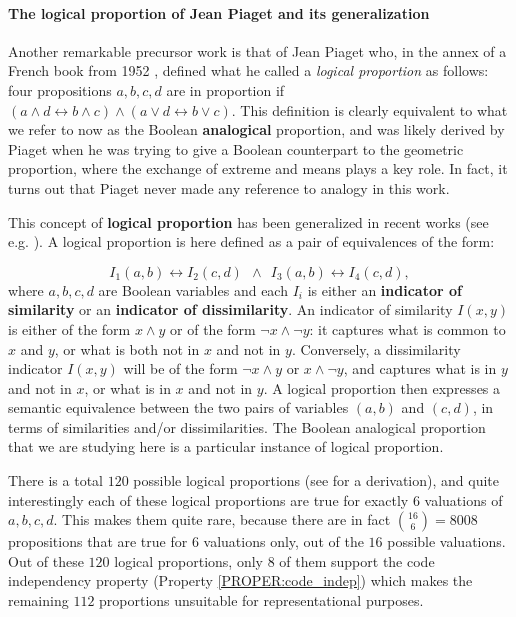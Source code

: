 \paragraph{The logical proportion of Jean Piaget and its generalization\\}
Another remarkable precursor work is that of Jean Piaget who, in the annex of a
French book from 1952 \cite{Pia52}, defined what he called a \textit{logical
proportion} as follows: four propositions $a, b, c,d$ are in proportion if $(a
\wedge d \leftrightarrow b \wedge c) \wedge (a \vee  d \leftrightarrow b \vee
c)$. This definition is clearly equivalent to what we refer to now as the
Boolean \textbf{analogical} proportion, and was likely derived by Piaget when
he was trying to give a Boolean counterpart to the geometric proportion, where
the exchange of extreme and means plays a key role. In fact, it turns out that
Piaget never made any reference to analogy in this work.

This concept of \textbf{logical proportion} has been generalized in recent
works (see e.g. \cite{PraRic13LU}). A logical proportion is here defined as a
pair of equivalences of the form:

$$I_1(a, b) \leftrightarrow I_2(c, d) ~~ \wedge ~~ I_3(a, b) \leftrightarrow I_4(c,
d),$$
where $a, b, c, d$ are Boolean variables and each $I_i$ is either an
\textbf{indicator of similarity} or an \textbf{indicator of dissimilarity}. An
indicator of similarity $I(x, y)$ is either of the form $x \wedge y$  or
of the form $\neg x \wedge \neg y$: it captures what is common to $x$ and $y$,
or what is both not in $x$ and not in $y$. Conversely, a dissimilarity indicator $I(x,
y)$ will be of the form $\neg x \wedge y$ or $x \wedge \neg y$,  and captures
what is in $y$ and not in $x$, or what is in $x$ and not in $y$.  A logical
proportion then expresses a semantic equivalence between the two pairs of
variables $(a, b)$ and $(c, d)$, in terms of similarities and/or
dissimilarities. The Boolean analogical proportion that we are studying here is
a particular instance of logical proportion.

There is a total $120$ possible logical proportions (see \cite{PraRic12} for a
derivation), and quite interestingly each of these logical proportions are
true for exactly $6$ valuations of $a, b, c, d$. This makes them quite rare,
because there are in fact $\binom{16}{6} = 8008$ propositions that are true for
$6$ valuations only, out of the $16$ possible valuations. Out of these $120$
logical proportions, only $8$ of them support the code independency property
(Property \ref{PROPER:code_indep}) which makes the remaining $112$ proportions
unsuitable for representational purposes.

